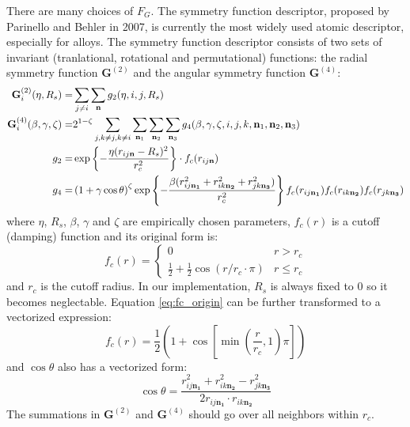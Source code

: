 \documentclass[prb,preprint]{revtex4-2}
\begin{document}
\newcommand{\rijna}{r_{ij\mathbf{n_1}}}
\newcommand{\rikna}{r_{ik\mathbf{n_2}}}
\newcommand{\rjkna}{r_{jk\mathbf{n_3}}}

There are many choices of $F_G$. The symmetry function descriptor, proposed 
by Parinello and Behler in 2007\cite{Behler}, is currently the most widely used 
atomic descriptor, especially for alloys. The symmetry function descriptor 
consists of two sets of invariant (tranlational, rotational and permutational) 
functions: the radial symmetry function $\mathbf{G}^{(2)}$ and the angular 
symmetry function $\mathbf{G}^{(4)}$:
\begin{align}
\label{eq:G2}
\mathbf{G}^{(2)}_i(\eta, R_s) = & \sum_{j \neq i}{
    \sum_{\mathbf{n}}{g_2 (\eta, i, j, R_s)}
} \\
\label{eq:G4}
\mathbf{G}^{(4)}_i(\beta, \gamma, \zeta) 
= & 2^{1-\zeta}\sum_{j, k\neq j, k\neq i}{
    \sum_{\mathbf{n}_1}{\sum_{\mathbf{n}_2}{\sum_{\mathbf{n}_3}{
        g_4(\beta, \gamma, \zeta, 
          i, j, k, 
          \mathbf{n}_1, \mathbf{n}_2, \mathbf{n}_3)
    }}}
} \\
\label{eq:g2}
g_2 = & \exp\left\{-\frac{\eta(\rijn - R_s)^2}{r_c^2} \right\}
\cdot f_c(\rijn) \\
g_4 = & \left( 1 + \gamma\cos\theta \right)^\zeta 
    \exp \left\{ -\frac{\beta(\rijna^2 + \rikna^2 + \rjkna^2)}{r_c^2} \right\}
f_c(\rijna)f_c(\rikna)f_c(\rjkna)
\end{align}
where $\eta$, $R_s$, $\beta$, $\gamma$ and $\zeta$ are empirically chosen 
parameters, $f_c(r)$ is a cutoff (damping) function and its original form is:
\begin{equation}
\label{eq:fc_origin}
f_c(r) =
    \begin{cases}
    0 & \text{$r > r_c$} \\
    \frac{1}{2} + \frac{1}{2}\cos\left(r / r_c \cdot \pi \right) & 
    \text{$r \leq r_c$}
    \end{cases}
\end{equation}
and $r_c$ is the cutoff radius. In our implementation, $R_s$ is always fixed to 
0 so it becomes neglectable\cite{AMP}. Equation \eqref{eq:fc_origin} can be 
further transformed to a vectorized expression:
\begin{equation}
\label{eq:fc}
f_c(r) = \frac{1}{2}\left( 
    1 + \cos\left[ \min(\frac{r}{r_c}, 1) \pi \right] 
\right)
\end{equation} 
and $\cos\theta$ also has a vectorized form:
\begin{equation}
\cos\theta = \frac{\rijna^2 + \rikna^2 - \rjkna^2}{2 \rijna \cdot \rikna}
\end{equation}
The summations in $\mathbf{G}^{(2)}$ and $\mathbf{G}^{(4)}$ should go over all 
neighbors within $r_c$. 
\end{document}

